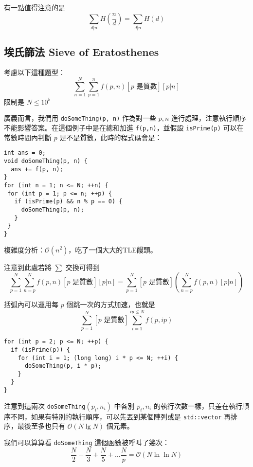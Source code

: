 有一點值得注意的是
$$\sum_{d\vert n} H\left(\frac{n}{d}\right)=\sum_{d\vert n} H(d)$$


\subsection{埃氏篩法 Sieve of Eratosthenes}
\label{sec:div:se}

考慮以下這種題型：
$$\sum_{n=1}^N\sum_{p=1}^n f(p,n)\left[p\textsf{ 是質數}\right][p|n]$$ 限制是 $N\leq 10^5$

廣義而言，我們用 \lstinline{doSomeThing(p, n)} 作為對一些 $p,n$ 進行處理，注意執行順序不能影響答案。在這個例子中是在總和加進 \lstinline{f(p,n)}，並假設 \lstinline{isPrime(p)} 可以在常數時間內判斷 $p$ 是不是質數，此時的程式碼會是：

\begin{lstlisting}[caption=硬解]
int ans = 0;
void doSomeThing(p, n) {
  ans += f(p, n);
}
for (int n = 1; n <= N; ++n) {
 for (int p = 1; p <= n; ++p) {
   if (isPrime(p) && n % p == 0) {
     doSomeThing(p, n);
   }
 } 
}
\end{lstlisting}

複雜度分析：$\mathcal{O}(n^2)$，吃了一個大大的TLE饅頭。

注意到此處若將 $\sum$ 交換可得到
$$\sum_{p=1}^N\sum_{n=p}^N f(p,n)\left[p\textsf{ 是質數}\right][p|n]
=\sum_{p=1}^N\left[p \textsf{ 是質數}\right]\left(\sum_{n=p}^N f(p,n)[p| n]\right)$$

括弧內可以運用每 $p$ 個跳一次的方式加速，也就是
$$\sum_{p=1}^N[p\textsf{ 是質數}]\sum_{i=1}^{ip\leq N} f(p,ip)$$

\begin{lstlisting}[caption=交換迴圈的加速效果]
for (int p = 2; p <= N; ++p) {
  if (isPrime(p)) {
    for (int i = 1; (long long) i * p <= N; ++i) {
      doSomeThing(p, i * p);
    }
  }
}
\end{lstlisting}

注意到這兩次 \lstinline{doSomeThing}$(p_i, n_i)$ 中各別 $p_i,n_i$ 的執行次數一樣，只差在執行順序不同，如果有特別的執行順序，可以先丟到某個陣列或是 \lstinline{std::vector} 再排序，最後至多也只有 $\mathcal{O}(N\lg N)$ 個元素。


我們可以算算看 \lstinline{doSomeThing} 這個函數被呼叫了幾次：
$$\frac N2+\frac N3+\frac N5+\ldots\frac Np=\mathcal{O}(N\ln\ln N)$$

